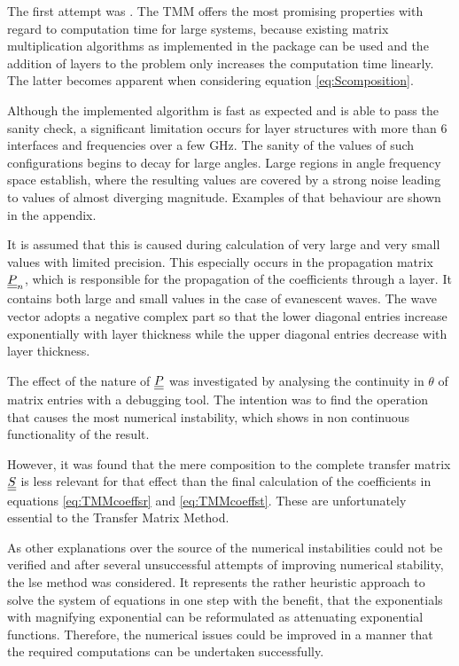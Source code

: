 The first attempt was . The TMM offers the most promising
properties with regard to computation time for large systems, because existing
matrix multiplication algorithms as implemented in the  package can
be used and the addition of layers to the problem only increases the
computation time linearly. The latter becomes apparent when considering
equation \ref{eq:Scomposition}.

Although the implemented algorithm is fast as expected and is able to pass the
sanity check, a significant limitation occurs for layer structures with more
than 6 interfaces and frequencies over a few GHz. The sanity of the values of
such configurations begins to decay for large angles. Large regions in angle
frequency space establish, where the resulting values are covered by a strong
noise leading to values of almost diverging magnitude. Examples of that
behaviour are shown in the appendix.

It is assumed that this is caused during calculation of very large and very
small values with limited precision. 
This especially occurs in the propagation matrix $\underline{\underline{P}}_n$, which is
responsible for the propagation of the coefficients through a layer. It
contains
both large and small
values in the case of evanescent waves. The wave vector adopts
a negative complex part so that the lower diagonal entries increase
exponentially with layer thickness while the upper diagonal entries decrease
with layer thickness.

The effect of the nature of $\underline{\underline{P}}$ was investigated by analysing
the continuity in $\theta$ of matrix entries with a debugging tool. The
intention was to find the operation that causes the most numerical instability,
which shows in non continuous functionality of the result.

However, it was found that the mere composition to the complete transfer
matrix $\underline{\underline{S}}$ is less relevant for that effect than the final calculation
of the coefficients in equations \ref{eq:TMMcoeffsr} and \ref{eq:TMMcoeffst}.
These are unfortunately essential to the Transfer Matrix Method.

As other explanations over the source of the numerical instabilities could not
be verified and after several unsuccessful attempts of improving numerical
stability, the lse method was considered. It represents the rather heuristic
approach to solve the system of equations in one step with the benefit, that
the exponentials with magnifying exponential can be reformulated as attenuating
exponential functions. Therefore, the numerical issues could be improved in a
manner that the required computations can be undertaken successfully.


